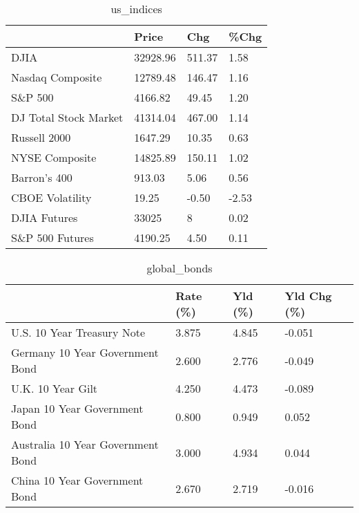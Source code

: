 \documentclass{article}%
\begin{document}
%


\begin{table}[htbp]%
\caption{us\_indices}%
\centering%
\begin{adjustbox}{width=1\textwidth}%
\begin{tabular}{llll}
\toprule
                      &    Price &    Chg &  \%Chg \\
\midrule
                 DJIA & 32928.96 & 511.37 &  1.58 \\
     Nasdaq Composite & 12789.48 & 146.47 &  1.16 \\
              S\&P 500 &  4166.82 &  49.45 &  1.20 \\
DJ Total Stock Market & 41314.04 & 467.00 &  1.14 \\
         Russell 2000 &  1647.29 &  10.35 &  0.63 \\
       NYSE Composite & 14825.89 & 150.11 &  1.02 \\
         Barron's 400 &   913.03 &   5.06 &  0.56 \\
      CBOE Volatility &    19.25 &  -0.50 & -2.53 \\
         DJIA Futures &    33025 &      8 &  0.02 \\
      S\&P 500 Futures &  4190.25 &   4.50 &  0.11 \\
\bottomrule
\end{tabular}
%
\end{adjustbox}%
\end{table}

%


\begin{table}[htbp]%
\caption{global\_bonds}%
\centering%
\begin{adjustbox}{width=1\textwidth}%
\begin{tabular}{llll}
\toprule
                                  & Rate (\%) & Yld (\%) & Yld Chg (\%) \\
\midrule
       U.S. 10 Year Treasury Note &    3.875 &   4.845 &      -0.051 \\
  Germany 10 Year Government Bond &    2.600 &   2.776 &      -0.049 \\
                U.K. 10 Year Gilt &    4.250 &   4.473 &      -0.089 \\
    Japan 10 Year Government Bond &    0.800 &   0.949 &       0.052 \\
Australia 10 Year Government Bond &    3.000 &   4.934 &       0.044 \\
    China 10 Year Government Bond &    2.670 &   2.719 &      -0.016 \\
\bottomrule
\end{tabular}
%
\end{adjustbox}%
\end{table}
\end{document}

